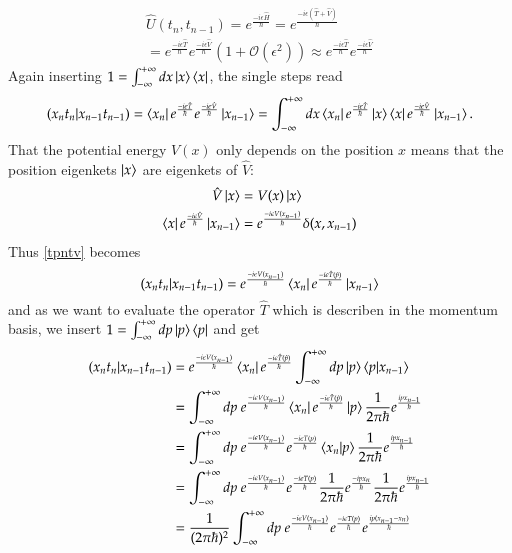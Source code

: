 \begin{align}\label{UTV}
  \hat{U}(t_{n},t_{n-1}) = e^{\frac{-i \epsilon \hat{H}}{\hbar}} = e^{\frac{-i \epsilon (\hat T + \hat V)}{\hbar}} \\
  = e^{\frac{-i \epsilon \hat{T}}{\hbar}} e^{\frac{-i \epsilon \hat{V}}{\hbar}} (1 + \mathcal{O} (\epsilon^2) ) \approx e^{\frac{-i \epsilon \hat{T}}{\hbar}} e^{\frac{-i \epsilon \hat{V}}{\hbar}} 
\end{align}
Again inserting $1 = \int_{-\infty}^{+\infty} dx \ket{x}\bra{x}$, the single steps read
\begin{equation}\label{tpntv}
  (x_n t_n | x_{n-1} t_{n-1}) = \bra{x_n} e^{\frac{-i \epsilon \hat{T}}{\hbar}} e^{\frac{-i \epsilon \hat{V}}{\hbar}}  \ket{x_{n-1}} = \int_{-\infty}^{+\infty} dx \bra{x_n} e^{\frac{-i \epsilon \hat{T}}{\hbar}} \ket{x} \bra{x} e^{\frac{-i \epsilon \hat{V}}{\hbar}}  \ket{x_{n-1}}.
\end{equation}
That the potential energy $V(x)$ only depends on the position $x$ means that the position eigenkets $\ket{x}$ are eigenkets of $\hat{V}$:
\begin{align}\label{Vx}
  \hat{V} \ket{x} &= V(x) \ket{x}  \\
  \bra{x} e^{\frac{-i \epsilon \hat{V}}{\hbar}}  \ket{x_{n-1}} &= e^{\frac{-i \epsilon V(x_{n-1})}{\hbar}} \delta (x,x_{n-1})
\end{align}
Thus \ref{tpntv} becomes
\begin{equation}\label{tpni}
   (x_n t_n | x_{n-1} t_{n-1}) = e^{\frac{-i \epsilon V(x_{n-1})}{\hbar}} \bra{x_n} e^{\frac{-i \epsilon \hat{T}(\hat{p})}{\hbar}} \ket{x_{n-1}}
\end{equation}
and as we want to evaluate the operator $\hat{T}$ which is describen in the momentum basis, we insert $1 = \int_{-\infty}^{+\infty} dp \ket{p}\bra{p}$ and get
\begin{align}\label{tpnp}
   (x_n t_n | x_{n-1} t_{n-1})  &= e^{\frac{-i \epsilon V(x_{n-1})}{\hbar}} \bra{x_n} e^{\frac{-i \epsilon \hat{T}(\hat{p})}{\hbar}} \int_{-\infty}^{+\infty} dp \ket{p}\braket{p|x_{n-1}} \\
                                &= \int_{-\infty}^{+\infty} dp \ e^{\frac{-i \epsilon V(x_{n-1})}{\hbar}} \bra{x_n} e^{\frac{-i \epsilon \hat{T}(\hat{p})}{\hbar}} \ket{p} \frac{1}{2 \pi \hbar} e^{\frac{i p x_{n-1}}{\hbar}} \\
                                &= \int_{-\infty}^{+\infty} dp \ e^{\frac{-i \epsilon V(x_{n-1})}{\hbar}} e^{\frac{-i \epsilon T(p)}{\hbar}} \braket{x_n|p} \frac{1}{2 \pi \hbar} e^{\frac{i p x_{n-1}}{\hbar}} \\
                                &= \int_{-\infty}^{+\infty} dp \ e^{\frac{-i \epsilon V(x_{n-1})}{\hbar}} e^{\frac{-i \epsilon T(p)}{\hbar}} \frac{1}{2 \pi \hbar} e^{\frac{- i p x_{n}}{\hbar}} \frac{1}{2 \pi \hbar} e^{\frac{i p x_{n-1}}{\hbar}}  \\
                                &= \frac{1}{(2 \pi \hbar)^2} \int_{-\infty}^{+\infty} dp \ e^{\frac{-i \epsilon V(x_{n-1})}{\hbar}} e^{\frac{-i \epsilon T(p)}{\hbar}} e^{\frac{i p (x_{n-1} -x_{n})}{\hbar}}
\end{align}
